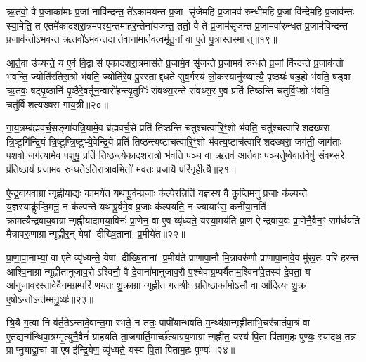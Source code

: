 {\anuvakamend[{प्रा॒जा॒प॒त्यो वा ए॒ष य॒ज्ञो यद्द॑शरा॒त्रस्त्रि॑क॒कुद्वा ए॒ता वै जा॑यत॒ एक॑त्रिशच्च॥५॥}]}

ऋ॒तवो॒ वै प्र॒जाका॑माः प्र॒जां नावि॑न्दन्त॒ ते॑ऽकामयन्त प्र॒जा सृ॑जेमहि प्र॒जामव॑ रुन्धीमहि प्र॒जां वि॑न्देमहि प्र॒जाव॑न्तः स्या॒मेति॒ त ए॒तमे॑कादशरा॒त्रम॑पश्य॒न्तमाह॑र॒न्तेना॑यजन्त॒ ततो॒ वै ते प्र॒जाम॑सृजन्त प्र॒जामवा॑रुन्धत प्र॒जाम॑विन्दन्त प्र॒जाव॑न्तोऽभव॒न्त ऋ॒तवो॑ऽभव॒न्तदार्त॒वाना॑मार्तव॒त्वमृ॑तू॒नां वा ए॒ते पु॒त्रास्तस्मात्॥१९॥

आ॒र्त॒वा उ॑च्यन्ते॒ य ए॒वं वि॒द्वास॑ एकादशरा॒त्रमास॑ते प्र॒जामे॒व सृ॑जन्ते प्र॒जामव॑ रुन्धते प्र॒जां वि॑न्दन्ते प्र॒जाव॑न्तो भवन्ति॒ ज्योति॑रतिरा॒त्रो भ॑वति॒ ज्योति॑रे॒व पु॒रस्ताद्दधते सुव॒र्गस्य॑ लो॒कस्यानु॑ख्यात्यै॒ पृष्ठ्यः॑ षड॒हो भ॑वति॒ षड्वा ऋ॒तवः॒ षट्पृ॒ष्ठानि॑ पृ॒ष्ठैरे॒वर्तून॒न्वारो॑हन्त्यृ॒तुभिः॑ संवथ्स॒रन्ते सं॑वथ्स॒र ए॒व प्रति॑ तिष्ठन्ति चतुर्वि॒ꣳ॒शो भ॑वति॒ चतु॑र्विशत्यख्षरा गाय॒त्री॥२०॥

गा॒य॒त्रम्ब्र॑ह्मवर्च॒सङ्गा॑यत्रि॒यामे॒व ब्र॑ह्मवर्च॒से प्रति॑ तिष्ठन्ति चतुश्चत्वारि॒ꣳ॒शो भ॑वति॒ चतु॑श्चत्वारिशदख्षरा त्रि॒ष्टुगि॑न्द्रि॒यं त्रि॒ष्टुप्त्रि॒ष्टुभ्ये॒वेन्द्रि॒ये प्रति॑ तिष्ठन्त्यष्टाचत्वारि॒ꣳ॒शो भ॑वत्य॒ष्टाच॑त्वारिशदख्षरा॒ जग॑ती॒ जाग॑ताः प॒शवो॒ जग॑त्यामे॒व प॒शुषु॒ प्रति॑ तिष्ठन्त्येकादशरा॒त्रो भ॑वति॒ पञ्च॒ वा ऋ॒तव॑ आर्त॒वाः पञ्च॒र्तुष्वे॒वार्त॒वेषु॑ संवथ्स॒रे प्र॑ति॒ष्ठाय॑ प्र॒जामव॑ रुन्धतेऽतिरा॒त्राव॒भितो॑ भवतः प्र॒जायै॒ परि॑गृहीत्यै॥२१॥

{\anuvakamend[{तस्माद्गाय॒त्र्येका॒न्नप॑ञ्चा॒शच्च॑॥६॥}]}

ऐ॒न्द्र॒वा॒य॒वाग्रान्गृह्णीया॒द्यः का॒मये॑त यथापू॒र्वम्प्र॒जाः क॑ल्पेर॒न्निति॑ य॒ज्ञस्य॒ वै कॢप्ति॒मनु॑ प्र॒जाः क॑ल्पन्ते य॒ज्ञस्याकॢ॑प्ति॒मनु॒ न क॑ल्पन्ते यथापू॒र्वमे॒व प्र॒जाः क॑ल्पयति॒ न ज्यायाꣳ॑सं॒ कनी॑या॒नति॑ क्रामत्यैन्द्रवाय॒वाग्रान्गृह्णीयादामया॒विनः॑ प्रा॒णेन॒ वा ए॒ष व्यृ॑ध्यते॒ यस्या॒मय॑ति प्रा॒ण ऐन्द्रवाय॒वः प्रा॒णेनै॒वैन॒ꣳ॒ सम॑र्धयति मैत्रावरु॒णाग्रान्गृह्णीर॒न् येषां दीख्षि॒तानां प्र॒मीये॑त॥२२॥

प्रा॒णा॒पा॒नाभ्यां॒ वा ए॒ते व्यृ॑ध्यन्ते॒ येषां दीख्षि॒तानां प्र॒मीय॑ते प्राणापा॒नौ मि॒त्रावरु॑णौ प्राणापा॒नावे॒व मु॑ख॒तः परि॑ हरन्त आश्वि॒नाग्रान्गृह्णीतानुजाव॒रोऽश्विनौ॒ वै दे॒वाना॑मानुजाव॒रौ प॒श्चेवाग्र॒म्पर्यैताम॒श्विना॑वे॒तस्य॑ दे॒वता॒ य आ॑नुजाव॒रस्तावे॒वैन॒मग्र॒म्परि॑ णयतः शु॒क्राग्रान्गृह्णीत ग॒तश्रीः प्रति॒ष्ठाका॑मो॒ऽसौ वा आ॑दि॒त्यः शु॒क्र ए॒षोऽन्तोऽन्त॑म्मनु॒ष्यः॑॥२३॥

श्रि॒यै ग॒त्वा नि व॑र्त॒तेऽन्ता॑दे॒वान्त॒मा र॑भते॒ न ततः॒ पापी॑यान्भवति म॒न्थ्य॑ग्रान्गृह्णीताभि॒चर॑न्नार्तपा॒त्रं वा ए॒तद्यन्म॑न्थिपा॒त्रम्मृ॒त्युनै॒वैनं॑ ग्राहयति ता॒जगार्ति॒मार्च्छ॑त्याग्रय॒णाग्रान्गृह्णीत॒ यस्य॑ पि॒ता पि॑ताम॒हः पुण्यः॒ स्यादथ॒ तन्न प्राप्नु॒याद्वा॒चा वा ए॒ष इ॑न्द्रि॒येण॒ व्यृ॑ध्यते॒ यस्य॑ पि॒ता पि॑ताम॒हः पुण्यः॑॥२४॥

